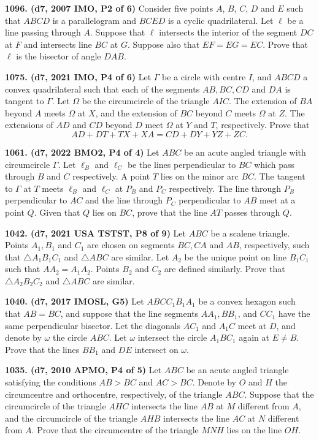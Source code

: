 \documentclass{article}
\begin{document}
\textbf{1096. (\color{red}d7\color{black}, 2007 IMO, P2 of 6)} Consider five points $ A$, $ B$, $ C$, $ D$ and $ E$ such that $ ABCD$ is a parallelogram and $ BCED$ is a cyclic quadrilateral. Let $ \ell$ be a line passing through $ A$. Suppose that $ \ell$ intersects the interior of the segment $ DC$ at $ F$ and intersects line $ BC$ at $ G$. Suppose also that $ EF = EG = EC$. Prove that $ \ell$ is the bisector of angle $ DAB$.

\textbf{1075. (\color{red}d7\color{black}, 2021 IMO, P4 of 6)} Let $\Gamma$ be a circle with centre $I$, and $A B C D$ a convex quadrilateral such that each of the segments $A B, B C, C D$ and $D A$ is tangent to $\Gamma$. Let $\Omega$ be the circumcircle of the triangle $A I C$. The extension of $B A$ beyond $A$ meets $\Omega$ at $X$, and the extension of $B C$ beyond $C$ meets $\Omega$ at $Z$. The extensions of $A D$ and $C D$ beyond $D$ meet $\Omega$ at $Y$ and $T$, respectively. Prove that \[A D+D T+T X+X A=C D+D Y+Y Z+Z C.\]

\textbf{1061. (\color{red}d7\color{black}, 2022 BMO2, P4 of 4)} Let $ABC$ be an acute angled triangle with circumcircle $\Gamma$. Let $\ell_B$ and $\ell_C$ be the lines perpendicular to $BC$ which pass through $B$ and $C$ respectively. A point $T$ lies on the minor arc $BC$. The tangent to $\Gamma$ at $T$ meets $\ell_B$ and $\ell_C$ at $P_B$ and $P_C$ respectively. The line through $P_B$ perpendicular to $AC$ and the line through $P_C$ perpendicular to $AB$ meet at a point $Q$. Given that $Q$ lies on $BC$, prove that the line $AT$ passes through $Q$.

\textbf{1042. (\color{red}d7\color{black}, 2021 USA TSTST, P8 of 9)} Let $ABC$ be a scalene triangle. Points $A_1,B_1$ and $C_1$ are chosen on segments $BC,CA$ and $AB$, respectively, such that $\triangle A_1B_1C_1$ and $\triangle ABC$ are similar. Let $A_2$ be the unique point on line $B_1C_1$ such that $AA_2=A_1A_2$. Points $B_2$ and $C_2$ are defined similarly. Prove that $\triangle A_2B_2C_2$ and $\triangle ABC$ are similar.

\textbf{1040. (\color{red}d7\color{black}, 2017 IMOSL, G5)} Let $ABCC_1B_1A_1$ be a convex hexagon such that $AB=BC$, and suppose that the line segments $AA_1, BB_1$, and $CC_1$ have the same perpendicular bisector. Let the diagonals $AC_1$ and $A_1C$ meet at $D$, and denote by $\omega$ the circle $ABC$. Let $\omega$ intersect the circle $A_1BC_1$ again at $E \neq B$. Prove that the lines $BB_1$ and $DE$ intersect on $\omega$.

\textbf{1035. (\color{red}d7\color{black}, 2010 APMO, P4 of 5)} Let $ABC$ be an acute angled triangle satisfying the conditions $AB>BC$ and $AC>BC$. Denote by $O$ and $H$ the circumcentre and orthocentre, respectively, of the triangle $ABC.$ Suppose that the circumcircle of the triangle $AHC$ intersects the line $AB$ at $M$ different from $A$, and the circumcircle of the triangle $AHB$ intersects the line $AC$ at $N$ different from $A.$ Prove that the circumcentre of the triangle $MNH$ lies on the line $OH$.
\end{document}
